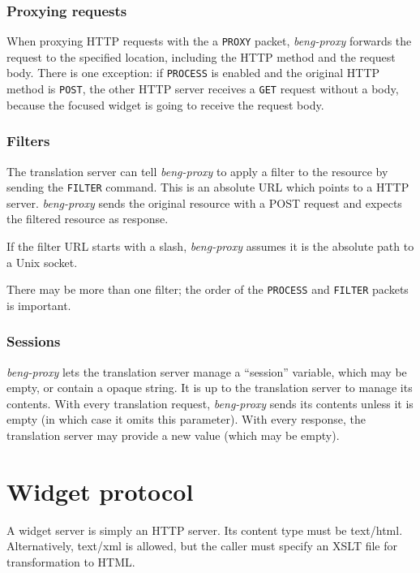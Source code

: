\documentclass[a4paper,12pt]{article}
\begin{document}
\subsubsection{Proxying requests}

When proxying HTTP requests with the a \texttt{PROXY} packet,
\emph{beng-proxy} forwards the request to the specified location,
including the HTTP method and the request body.  There is one
exception: if \texttt{PROCESS} is enabled and the original HTTP method
is \texttt{POST}, the other HTTP server receives a \texttt{GET}
request without a body, because the focused widget is going to receive
the request body.

\subsubsection{Filters}
\label{filter}

The translation server can tell \emph{beng-proxy} to apply a filter to
the resource by sending the \texttt{FILTER} command.  This is an
absolute URL which points to a HTTP server.  \emph{beng-proxy} sends
the original resource with a POST request and expects the filtered
resource as response.

If the filter URL starts with a slash, \emph{beng-proxy} assumes it is
the absolute path to a Unix socket.

There may be more than one filter; the order of the \texttt{PROCESS}
and \texttt{FILTER} packets is important.

\subsubsection{Sessions}
\label{sessions}

\emph{beng-proxy} lets the translation server manage a ``session''
variable, which may be empty, or contain a opaque string.  It is up to
the translation server to manage its contents.  With every translation
request, \emph{beng-proxy} sends its contents unless it is empty (in
which case it omits this parameter).  With every response, the
translation server may provide a new value (which may be empty).


\section{Widget protocol}

A widget server is simply an HTTP server.  Its content type must be
text/html.  Alternatively, text/xml is allowed, but the caller must
specify an XSLT file for transformation to HTML.
\end{document}
